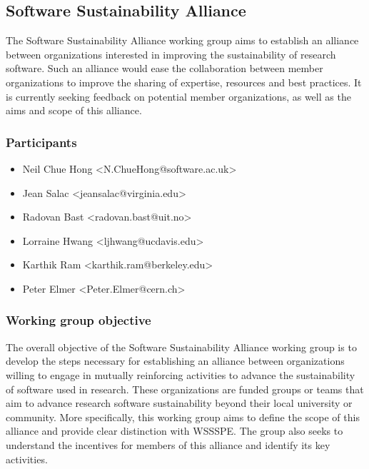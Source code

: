 \subsection{Software Sustainability Alliance}
\label{sec:alliance}


The Software Sustainability Alliance working group aims to establish an alliance between organizations interested in improving the sustainability of research software. Such an alliance would ease the collaboration between member organizations to improve the sharing of expertise, resources and best practices. It is currently seeking feedback on potential member organizations, as well as the aims and scope of this alliance.

\subsubsection{Participants}

\begin{itemize}
\item Neil Chue Hong <N.ChueHong@software.ac.uk>
\item Jean Salac <jeansalac@virginia.edu>
\item Radovan Bast <radovan.bast@uit.no>
\item Lorraine Hwang <ljhwang@ucdavis.edu>
\item Karthik Ram <karthik.ram@berkeley.edu>
\item Peter Elmer <Peter.Elmer@cern.ch>
\end{itemize}


\subsubsection{Working group objective}

The overall objective of the Software Sustainability Alliance working group is to develop the steps necessary for establishing an alliance between organizations willing to engage in mutually reinforcing activities to advance the sustainability of software used in research. These organizations are funded groups or teams that aim to advance research software sustainability beyond their local university or community. More specifically, this working group aims to define the scope of this alliance and provide clear distinction with WSSSPE. The group also seeks to understand the incentives for members of this alliance and identify its key activities.

